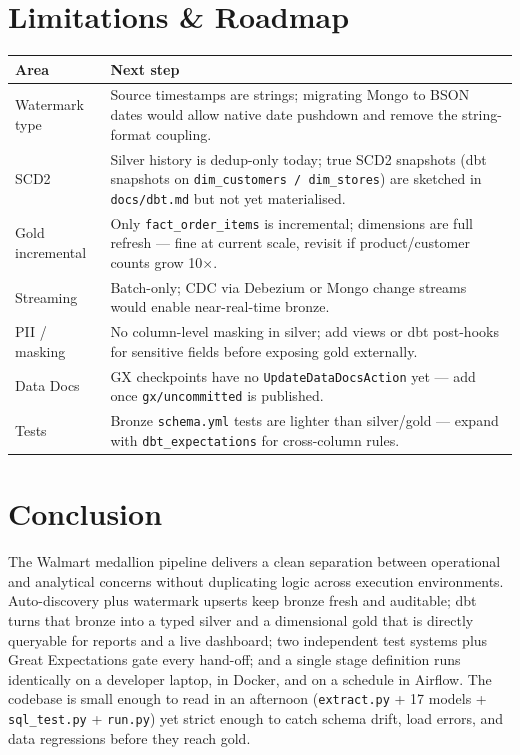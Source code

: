 \documentclass[11pt,a4paper]{article}
\begin{document}
\section{Limitations \& Roadmap}

\begin{center}
\begin{longtable}{>{\raggedright\arraybackslash}p{4.2cm} >{\raggedright\arraybackslash}p{10.6cm}}
\toprule
Area & Next step \\
\midrule
\endhead
Watermark type & Source timestamps are strings; migrating Mongo to BSON dates would allow native date pushdown and remove the string-format coupling. \\
SCD2 & Silver history is dedup-only today; true SCD2 snapshots (dbt snapshots on \texttt{dim\_customers / dim\_stores}) are sketched in \texttt{docs/dbt.md} but not yet materialised. \\
Gold incremental & Only \texttt{fact\_order\_items} is incremental; dimensions are full refresh — fine at current scale, revisit if product/customer counts grow 10$\times$. \\
Streaming & Batch-only; CDC via Debezium or Mongo change streams would enable near-real-time bronze. \\
PII / masking & No column-level masking in silver; add views or dbt post-hooks for sensitive fields before exposing gold externally. \\
Data Docs & GX checkpoints have no \texttt{UpdateDataDocsAction} yet — add once \texttt{gx/uncommitted} is published. \\
Tests & Bronze \texttt{schema.yml} tests are lighter than silver/gold — expand with \texttt{dbt\_expectations} for cross-column rules. \\
\bottomrule
\end{longtable}
\end{center}

\section{Conclusion}

The Walmart medallion pipeline delivers a clean separation between operational and analytical concerns without duplicating logic across execution environments. Auto-discovery plus watermark upserts keep bronze fresh and auditable; dbt turns that bronze into a typed silver and a dimensional gold that is directly queryable for reports and a live dashboard; two independent test systems plus Great Expectations gate every hand-off; and a single stage definition runs identically on a developer laptop, in Docker, and on a schedule in Airflow. The codebase is small enough to read in an afternoon (\texttt{extract.py} + 17 models + \texttt{sql\_test.py} + \texttt{run.py}) yet strict enough to catch schema drift, load errors, and data regressions before they reach gold.
\end{document}
